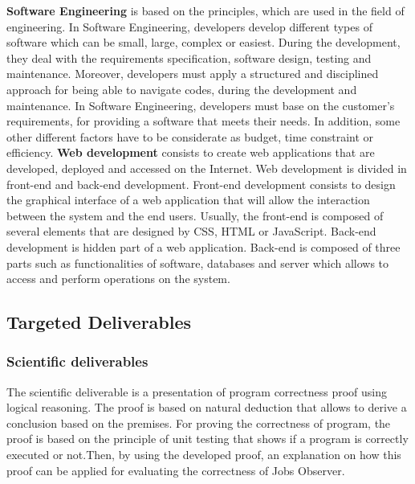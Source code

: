 \documentclass[conference,compsoc]{IEEEtran}
\begin{document}
\textbf{Software Engineering} is based on the principles, which are used in the field of engineering. In Software Engineering, developers develop different types of software which can be small, large, complex or easiest. During the development, they deal with the requirements specification, software design, testing and maintenance. Moreover, developers must apply a structured and disciplined approach for being able to navigate codes, during the development and maintenance.  
\newline                                 
In Software Engineering, developers must base on the customer's requirements, for providing a software that meets their needs. In addition, some other different factors have to be considerate as budget, time constraint or efficiency.
\newline\newline
\textbf{Web development} consists to create web applications that are developed, deployed and accessed on the Internet. Web development is divided in front-end and back-end development. 
\newline                                   
Front-end development consists to design the graphical interface of a web application that will allow the interaction between the system and the end users. Usually, the front-end is composed of several elements that are designed by CSS, HTML or JavaScript.              
\newline                                                                             
Back-end development is hidden part of a web application. Back-end is composed of three parts such as functionalities of software, databases and server which allows to access and perform operations on the system.

\subsection{Targeted Deliverables}
\label{sec-deliverables}
\subsubsection{Scientific deliverables}
The scientific deliverable is a presentation of program correctness proof using logical reasoning. The proof is based on natural deduction that allows to derive a conclusion based on the premises. 
\newline
For proving the correctness of program, the proof is based on the principle of unit testing that shows if a program is correctly executed or not.Then, by using the developed proof, an explanation on how this proof can be applied for evaluating the correctness of Jobs Observer. 
\end{document}
